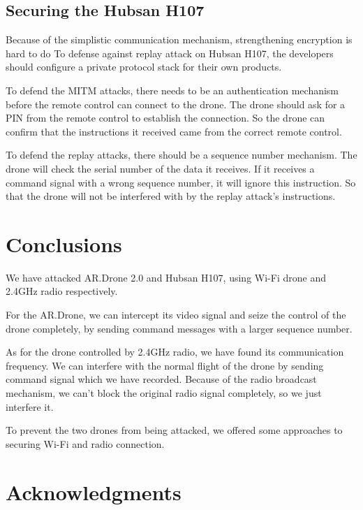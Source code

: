 \documentclass{acm_proc_article-sp}
\begin{document}
\subsection{Securing the Hubsan H107}

 Because of the simplistic communication mechanism, strengthening encryption is hard to do To defense against replay attack on Hubsan H107, the developers should configure a private protocol stack for their own products.
 
 To defend the MITM attacks, there needs to be an authentication mechanism before the remote control can connect to the drone. The drone should ask for a PIN from the remote control to establish the connection. So the drone can confirm that the instructions it received came from the correct remote control.
 
  To defend the  replay attacks, there should be a sequence number mechanism. The drone will check the serial number of the data it receives. If it receives a command signal with a wrong sequence number, it will ignore this instruction. So that the drone will not be interfered with by the replay attack's instructions.

\section{Conclusions}

We have attacked AR.Drone 2.0 and Hubsan H107, using Wi-Fi drone and 2.4GHz radio respectively. 

For the AR.Drone, we can intercept its video signal and seize the control of the drone completely, by sending command messages with a larger sequence number. 

As for the drone controlled by 2.4GHz radio, we have found its communication frequency. We can interfere with the normal flight of the drone by sending command signal which we have recorded. Because of the radio broadcast mechanism, we can't block the original radio signal completely, so we just interfere it.

To prevent the two drones from being attacked, we offered some approaches to securing Wi-Fi and radio connection.


\section{Acknowledgments}
\end{document}
